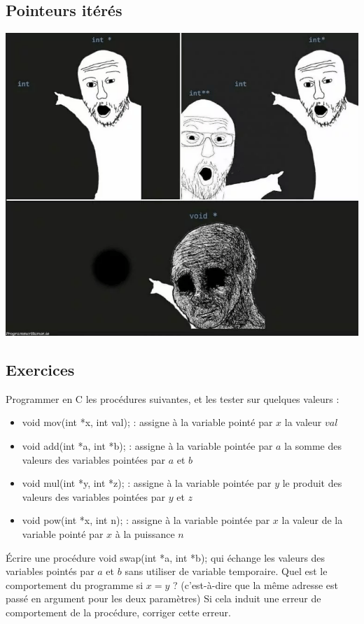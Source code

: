 \documentclass[../../../main.tex]{subfiles}
\begin{document}
\subsection{Pointeurs itérés}
\begin{minipage}{\textwidth}
	\begin{center}
		\includegraphics[width=.75\textwidth]{pointer_meme}
	\end{center}
\end{minipage}
\subsection{Exercices}
 Programmer en C les procédures suivantes, et les tester sur quelques valeurs :
\begin{itemize}
	\item \textsf{void mov(int *x, int val);} : assigne à la variable pointé par $x$ la valeur $val$
	\item \textsf{void add(int *a, int *b);} : assigne à la variable pointée par $a$ la somme des valeurs des variables pointées par $a$ et $b$
	\item \textsf{void mul(int *y, int *z);} : assigne à la variable pointée par $y$ le produit des valeurs des variables pointées par $y$ et $z$
	\item \textsf{void pow(int *x, int n);} : assigne à la variable pointée par $x$ la valeur de la variable pointé par $x$ à la puissance $n$
\end{itemize}
 Écrire une procédure \textsf{void swap(int *a, int *b);} qui échange les valeurs des variables pointés par $a$ et $b$ sans utiliser de variable temporaire. Quel est le comportement du programme si $x = y$ ? (c'est-à-dire que la même adresse est passé en argument pour les deux paramètres) \newline
Si cela induit une erreur de comportement de la procédure, corriger cette erreur.
 
\end{document}
